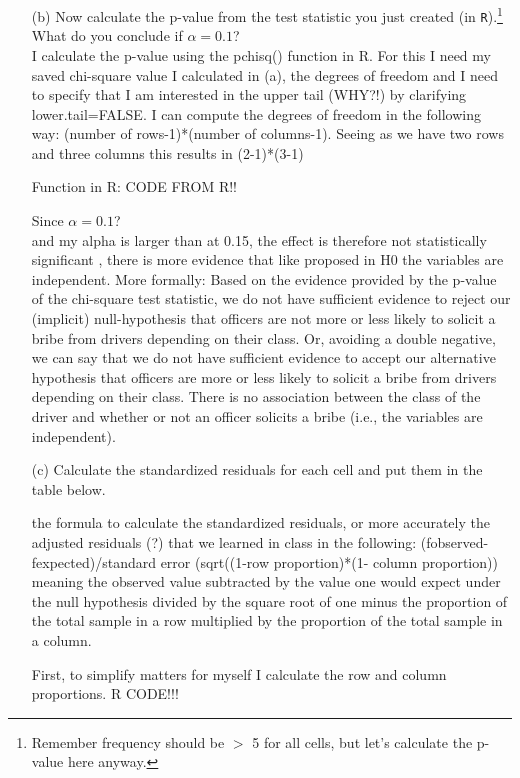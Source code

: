\documentclass[12pt,letterpaper]{article}
\begin{document}
\begin{enumerate}
	\item [(b)]
	Now calculate the p-value from the test statistic you just created (in \texttt{R}).\footnote{Remember frequency should be $>$ 5 for all cells, but let's calculate the p-value here anyway.}  What do you conclude if $\alpha = 0.1$?\\
	
	I calculate the p-value using the pchisq() function in R. For this I need my saved chi-square value I calculated in (a), the degrees of freedom and I need to specify that I am interested in the upper tail (WHY?!) by clarifying lower.tail=FALSE. I can compute the degrees of freedom in the following way: (number of rows-1)*(number of columns-1). Seeing as we have two rows and three columns this results in (2-1)*(3-1)
	
	Function in R:
	CODE FROM R!!
	
	Since $\alpha = 0.1$?\\ and my alpha is larger than at 0.15, the effect is therefore not statistically significant , there is more evidence that like proposed in H0 the variables are independent.
	More formally: Based on the evidence provided by the p-value of the chi-square test statistic, we do not have sufficient evidence to reject our (implicit) null-hypothesis that officers are not more or less likely to solicit a bribe from drivers depending on their class. 
	Or, avoiding a double negative, we can say that we do not have sufficient evidence to accept our alternative hypothesis that officers are more or less likely to solicit a bribe from drivers depending on their class. There is no association between the class of the driver and whether or not an officer solicits a bribe (i.e., the variables are independent). 
	\newpage
	\item [(c)] Calculate the standardized residuals for each cell and put them in the table below.
	\vspace{1cm}
	
	the formula to calculate the standardized residuals, or more accurately the adjusted residuals (?) that we learned in class in the following:
	(fobserved-fexpected)/standard error (sqrt((1-row proportion)*(1- column proportion))
	meaning the observed value subtracted by the value one would expect under the null hypothesis divided by the square root of one minus the proportion of the total sample in a row multiplied by the proportion of the total sample in a column.
	
	First, to simplify matters for myself I calculate the row and column proportions.
	R CODE!!!
	

\end{enumerate}
\end{document}
